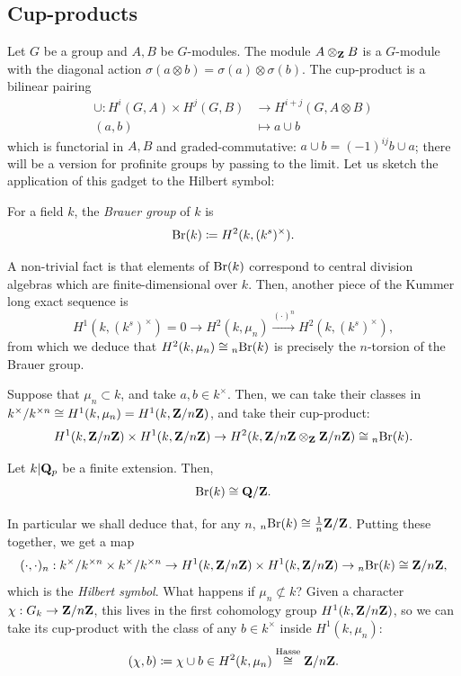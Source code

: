 \documentclass{article}
\begin{document}
\subsection{Cup-products}
Let $G$ be a group and $A,B$ be $G$-modules. The module $A\otimes_{\mathbf{Z}} B$ is a $G$-module with the diagonal action $\sigma(a\otimes b) = \sigma(a)\otimes\sigma(b)$. The cup-product is a bilinear pairing
\begin{align*}
	\cup: H^i(G,A)\times H^j(G,B) &\to H^{i+j}(G,A\otimes B)\\
	(a,b) &\mapsto a\cup b
\end{align*}
which is functorial in $A,B$ and graded-commutative: $a\cup b = (-1)^{ij}b\cup a$; there will be a version for profinite groups by passing to the limit. Let us sketch the application of this gadget to the Hilbert symbol:
\begin{defn}
		For a field $k$, the \emph{Brauer group} of $k$ is 
		\[
			\text{Br}(k)\coloneqq H^2(k,(k^s)^\times).
		\]
\end{defn}
A non-trivial fact is that elements of $\text{Br}(k)$ correspond to central division algebras which are finite-dimensional over $k$. Then, another piece of the Kummer long exact sequence is
\[
	H^1(k,(k^s)^\times)=0 \to H^2(k,\mu_n) \xrightarrow{(\cdot)^n} H^2(k,(k^s)^\times),
\]
from which we deduce that $H^2(k,\mu_n)\cong {_n\text{Br}(k)}$ is precisely the $n$-torsion of the Brauer group.

Suppose that $\mu_n\subset k$, and take $a,b\in k^\times$. Then, we can take their classes in $k^\times/k^{\times n}\cong H^1(k,\mu_n)=H^1(k,\mathbf{Z}/n\mathbf{Z})$, and take their cup-product:
\[
	H^1(k,\mathbf{Z}/n\mathbf{Z})\times H^1(k,\mathbf{Z}/n\mathbf{Z}) \to H^2(k,\mathbf{Z}/n\mathbf{Z}\otimes_{\mathbf{Z}} \mathbf{Z}/n\mathbf{Z}) \cong {_n\text{Br}(k)}.
\]
\begin{thm}[Hasse]\label{thm:hasse}
		Let $k|\mathbf{Q}_p$ be a finite extension. Then,
		\[
			\text{Br}(k) \cong \mathbf{Q}/\mathbf{Z}.	
		\]
\end{thm}
In particular we shall deduce that, for any $n$, ${_n\text{Br}(k)}\cong \frac{1}{n}\mathbf{Z}/\mathbf{Z}$. Putting these together, we get a map
\[
	(\cdot,\cdot)_n: k^\times/k^{\times n}\times k^\times/k^{\times n} \to H^1(k,\mathbf{Z}/n\mathbf{Z})\times H^1(k,\mathbf{Z}/n\mathbf{Z}) \to {_n\text{Br}(k)} \cong \mathbf{Z}/n\mathbf{Z},
\]
which is the \emph{Hilbert symbol}.
What happens if $\mu_n\not\subset k$? Given a character $\chi:G_k\to\mathbf{Z}/n\mathbf{Z}$, this lives in the first cohomology group $H^1(k,\mathbf{Z}/n\mathbf{Z})$, so we can take its cup-product with the class of any $b\in k^\times$ inside $H^1(k,\mu_n)$:
\[
	(\chi,b)\coloneqq \chi\cup b \in H^2(k,\mu_n) \overset{\text{Hasse}}{\cong} \mathbf{Z}/n\mathbf{Z}.
\]
\end{document}

